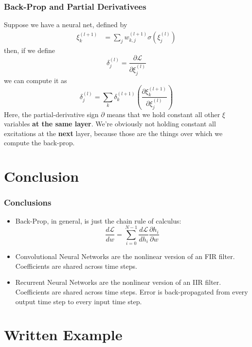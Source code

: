 \documentclass{beamer}
\begin{document}
\begin{frame}
  \frametitle{Back-Prop and Partial Derivativees}
  Suppose we have a neural net, defined by
  \begin{align*}
    \xi_k^{(l+1)} &= \sum_{j}w_{k,j}^{(l+1)}\sigma\left(\xi_j^{(l)}\right)
  \end{align*}
  then, if we define
  \[
  \delta_j^{(l)} = \frac{\partial{\mathcal L}}{\partial\xi_j^{(l)}}
  \]
  we can compute it as
  \[
  \delta_j^{(l)} = \sum_k\delta_k^{(l+1)}\left(\frac{\partial\xi_k^{(l+1)}}{\partial\xi_j^{(l)}}\right)
  \]
  Here, the partial-derivative sign $\partial$ means that we hold
  constant all other $\xi$ variables {\bf at the same layer}.  We're
  obviously not holding constant all excitations at the {\bf next}
  layer, because those are the things over which we compute the back-prop.
\end{frame}

\section{Conclusion}
\setcounter{subsection}{1}

\begin{frame}
  \frametitle{Conclusions}
  \begin{itemize}
  \item Back-Prop, in general, is just the chain rule of calculus:
    \begin{displaymath}
      \frac{d{\mathcal L}}{dw} = \sum_{i=0}^{N-1}\frac{d{\mathcal L}}{dh_i}\frac{\partial h_i}{\partial w}
    \end{displaymath}
  \item Convolutional Neural Networks are the nonlinear version of an FIR filter.
    Coefficients are shared across time steps.
  \item Recurrent Neural Networks are the nonlinear version of an IIR filter.  
    Coefficients are shared across time steps.
    Error is back-propagated from every output time step to every input time step.
  \end{itemize}
\end{frame}

\section[Example]{Written Example}
\setcounter{subsection}{1}
\end{document}
